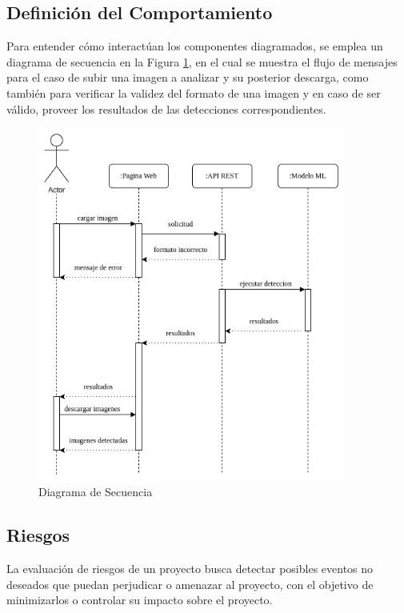 \newpage
\subsection{Definición del Comportamiento} %

Para entender cómo interactúan los componentes diagramados, se emplea un diagrama de secuencia en la Figura \ref{fig:secuencia}, en el cual se muestra el flujo de mensajes para el caso de subir una imagen a analizar y su posterior descarga, como también para verificar la validez del formato de una imagen y en caso de ser válido, proveer los resultados de las detecciones correspondientes.

\begin{figure}[h!]
    \centering
    \includegraphics[width=0.9\textwidth]{img/Diagrama de Secuencia.drawio.png}
    \caption{Diagrama de Secuencia}
    \label{fig:secuencia}
\end{figure}


\subsection{Riesgos}

La evaluación de riesgos de un proyecto busca detectar posibles eventos no deseados que puedan perjudicar o amenazar al proyecto, con el objetivo de minimizarlos o controlar su impacto sobre el proyecto.

